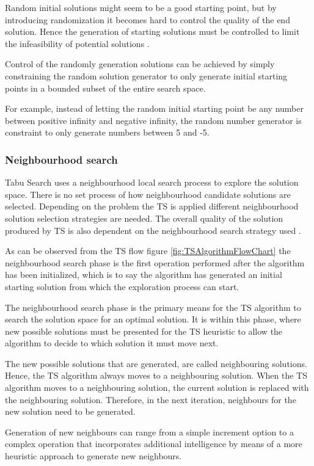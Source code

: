 Random initial solutions might seem to be a good starting point, but by introducing randomization it becomes hard to control the quality of the end solution\cite{TSHazardous}. Hence the generation of starting solutions must be controlled to limit the infeasibility of potential solutions \cite{TSHazardous}. 

Control of the randomly generation solutions can be achieved by simply constraining the random solution generator to only generate initial starting points in a bounded subset of the entire search space. 

For example, instead of letting the random initial starting point be any number between positive infinity and negative infinity, the random number generator is constraint to only generate numbers between 5 and -5.

\subsubsection{Neighbourhood search}
Tabu Search uses a neighbourhood local search process to explore the solution space. There is no set process of how neighbourhood candidate solutions are selected. Depending on the problem the TS is applied different neighbourhood solution selection strategies are needed. The overall quality of the solution produced by TS is also dependent on the neighbourhood search strategy used \cite{TSHazardous}. 

As can be observed from the TS flow figure \ref{fig:TSAlgorithmFlowChart} the neighbourhood search phase is the first operation performed after the algorithm has been initialized, which is to say the algorithm has generated an initial starting solution from which the exploration process can start.

The neighbourhood search phase is the primary means for the TS algorithm to search the solution space for an optimal solution. It is within this phase, where new possible solutions must be presented for the TS heuristic to allow the algorithm to decide to which solution it must move next.

The new possible solutions that are generated, are called neighbouring solutions. Hence, the TS algorithm always moves to a neighbouring solution. When the TS algorithm moves to a neighbouring solution, the current solution is replaced with the neighbouring solution. Therefore, in the next iteration, neighbours for the new solution need to be generated.

Generation of new neighbours can range from a simple increment option to a complex operation that incorporates additional intelligence by means of a more heuristic approach to generate new neighbours.


